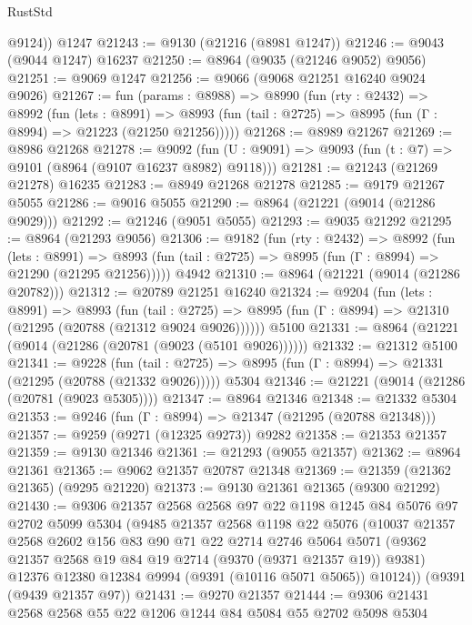 \begin{lexlean}{RustStd}
\begin{coremodule}
        @9124))
    @1247
@21243 := @9130 (@21216 (@8981 @1247))
@21246 := @9043 (@9044 @1247) @16237
@21250 := @8964 (@9035 (@21246 @9052) @9056)
@21251 := @9069 @1247
@21256 := @9066 (@9068 @21251 @16240 @9024 @9026)
@21267 := fun (params : @8988) =>
  @8990
    (fun (rty : @2432) =>
    @8992
      (fun (lets : @8991) =>
      @8993 (fun (tail : @2725) => @8995 (fun (Γ : @8994) => @21223 (@21250 @21256)))))
@21268 := @8989 @21267
@21269 := @8986 @21268
@21278 := @9092
    (fun (U : @9091) => @9093 (fun (t : @7) => @9101 (@8964 (@9107 @16237 @8982) @9118)))
@21281 := @21243 (@21269 @21278) @16235
@21283 := @8949 @21268 @21278
@21285 := @9179 @21267 @5055
@21286 := @9016 @5055
@21290 := @8964 (@21221 (@9014 (@21286 @9029)))
@21292 := @21246 (@9051 @5055)
@21293 := @9035 @21292
@21295 := @8964 (@21293 @9056)
@21306 := @9182
    (fun (rty : @2432) =>
    @8992
      (fun (lets : @8991) =>
      @8993 (fun (tail : @2725) => @8995 (fun (Γ : @8994) => @21290 (@21295 @21256)))))
    @4942
@21310 := @8964 (@21221 (@9014 (@21286 @20782)))
@21312 := @20789 @21251 @16240
@21324 := @9204
    (fun (lets : @8991) =>
    @8993
      (fun (tail : @2725) =>
      @8995 (fun (Γ : @8994) => @21310 (@21295 (@20788 (@21312 @9024 @9026))))))
    @5100
@21331 := @8964 (@21221 (@9014 (@21286 (@20781 (@9023 (@5101 @9026))))))
@21332 := @21312 @5100
@21341 := @9228
    (fun (tail : @2725) => @8995 (fun (Γ : @8994) => @21331 (@21295 (@20788 (@21332 @9026)))))
    @5304
@21346 := @21221 (@9014 (@21286 (@20781 (@9023 @5305))))
@21347 := @8964 @21346
@21348 := @21332 @5304
@21353 := @9246 (fun (Γ : @8994) => @21347 (@21295 (@20788 @21348)))
@21357 := @9259 (@9271 (@12325 @9273)) @9282
@21358 := @21353 @21357
@21359 := @9130 @21346
@21361 := @21293 (@9055 @21357)
@21362 := @8964 @21361
@21365 := @9062 @21357 @20787 @21348
@21369 := @21359 (@21362 @21365) (@9295 @21220)
@21373 := @9130 @21361 @21365 (@9300 @21292)
@21430 := @9306
    @21357
    @2568
    @2568
    @97
    @22
    @1198
    @1245
    @84
    @5076
    @97
    @2702
    @5099
    @5304
    (@9485
      @21357
      @2568
      @1198
      @22
      @5076
      (@10037
        @21357
        @2568
        @2602
        @156
        @83
        @90
        @71
        @22
        @2714
        @2746
        @5064
        @5071
        (@9362 @21357 @2568 @19 @84 @19 @2714 (@9370 (@9371 @21357 @19)) @9381)
        @12376
        @12380
        @12384
        @9994
        (@9391 (@10116 @5071 @5065))
        @10124))
    (@9391 (@9439 @21357 @97))
@21431 := @9270 @21357
@21444 := @9306 @21431 @2568 @2568 @55 @22 @1206 @1244 @84 @5084 @55 @2702 @5098 @5304

\end{coremodule}
\end{lexlean}
